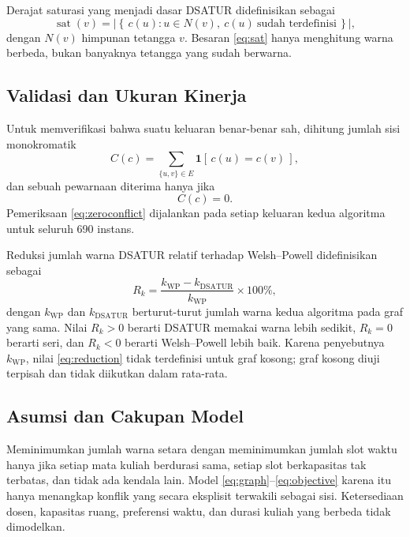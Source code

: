 \documentclass[conference,a4paper]{IEEEtran}
\newcommand{\WP}{\mathrm{WP}}
\newcommand{\DS}{\mathrm{DSATUR}}
\begin{document}
Derajat saturasi yang menjadi dasar DSATUR didefinisikan sebagai
\begin{equation}
\operatorname{sat}(v)
=
\left|\left\{\,c(u) : u\in N(v),\ c(u)\ \text{sudah terdefinisi}\,\right\}\right|,
\label{eq:sat}
\end{equation}
dengan $N(v)$ himpunan tetangga $v$. Besaran \eqref{eq:sat} hanya menghitung
warna berbeda, bukan banyaknya tetangga yang sudah berwarna.

\subsection{Validasi dan Ukuran Kinerja}
Untuk memverifikasi bahwa suatu keluaran benar-benar sah, dihitung jumlah sisi
monokromatik
\begin{equation}
C(c)=\sum_{\{u,v\}\in E} \mathbf{1}\left[\,c(u)=c(v)\,\right],
\label{eq:conflicts}
\end{equation}
dan sebuah pewarnaan diterima hanya jika
\begin{equation}
C(c)=0 .
\label{eq:zeroconflict}
\end{equation}
Pemeriksaan \eqref{eq:zeroconflict} dijalankan pada setiap keluaran kedua
algoritma untuk seluruh 690 instans.

Reduksi jumlah warna DSATUR relatif terhadap Welsh--Powell didefinisikan
sebagai
\begin{equation}
R_k=\frac{k_{\WP}-k_{\DS}}{k_{\WP}}\times 100\%,
\label{eq:reduction}
\end{equation}
dengan $k_{\WP}$ dan $k_{\DS}$ berturut-turut jumlah warna kedua algoritma pada
graf yang sama. Nilai $R_k>0$ berarti DSATUR memakai warna lebih sedikit,
$R_k=0$ berarti seri, dan $R_k<0$ berarti Welsh--Powell lebih baik. Karena
penyebutnya $k_{\WP}$, nilai \eqref{eq:reduction} tidak terdefinisi untuk graf
kosong; graf kosong diuji terpisah dan tidak diikutkan dalam rata-rata.

\subsection{Asumsi dan Cakupan Model}
Meminimumkan jumlah warna setara dengan meminimumkan jumlah slot waktu hanya
jika setiap mata kuliah berdurasi sama, setiap slot berkapasitas tak terbatas,
dan tidak ada kendala lain. Model \eqref{eq:graph}--\eqref{eq:objective}
karena itu hanya menangkap konflik yang secara eksplisit terwakili sebagai
sisi. Ketersediaan dosen, kapasitas ruang, preferensi waktu, dan durasi kuliah
yang berbeda tidak dimodelkan.
\end{document}
